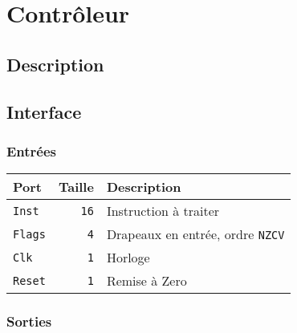 \section{Contrôleur}

\subsection{Description}

\subsection{Interface}

\subsubsection{Entrées}

\begin{tabular}{|l|r|l|}
\hline
\textbf{Port}		& \textbf{Taille} & \textbf{Description}\\
\hline

\texttt{Inst}		& \texttt{16} & Instruction à traiter\\
\hline
\texttt{Flags}		&  \texttt{4} & Drapeaux en entrée, ordre \texttt{NZCV}\\
\hline
\texttt{Clk}		&  \texttt{1} & Horloge\\
\hline
\texttt{Reset}		&  \texttt{1} & Remise à Zero\\
\hline


\hline
\end{tabular}


\subsubsection{Sorties}

